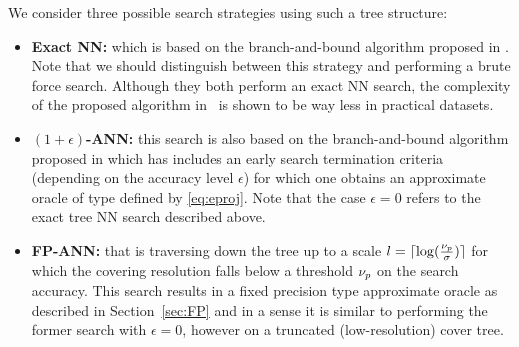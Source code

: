  We consider three possible search strategies 
 using such a tree structure:
 \begin{itemize}
 	\item \textbf{Exact NN:} which is based on the branch-and-bound algorithm proposed in \cite[Section 3.2]{beygelzimer2006cover}.	Note that we should distinguish between this strategy and performing a brute force search. Although they both perform an exact NN search, the complexity of the proposed algorithm in~\cite{beygelzimer2006cover} is shown to be way less in practical datasets.%
 	\item \textbf{$(1+\epsilon)$-ANN:} this search is also based on the branch-and-bound algorithm proposed in \cite[Section 3.2]{beygelzimer2006cover} which has includes an early search termination criteria (depending on the accuracy level $\epsilon$) 
 	for which one obtains an approximate  oracle of type defined by \eqref{eq:eproj}. %
 	Note that the case $\epsilon=0$ refers to the exact tree NN search described above. %
 	
 	\item \textbf{FP-ANN:} that is traversing down the tree up to a scale $l=\lceil \log(\frac{\nu_p}{\sigma})\rceil$ for which the covering resolution falls below a threshold $\nu_p$ on the search accuracy. This search results in a fixed precision type approximate oracle as described in Section~\ref{sec:FP} and in a sense it is similar to performing the former search with $\epsilon=0$, however on a truncated (low-resolution) cover tree. 
 	
 \end{itemize}
